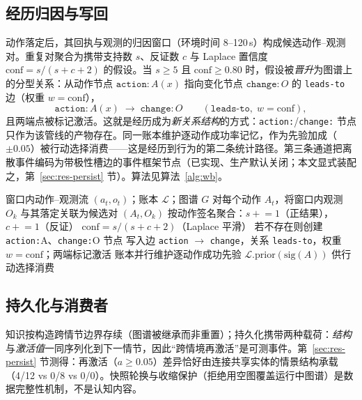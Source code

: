 \documentclass[10pt,a4paper]{ctexart}
\begin{document}
\subsection{经历归因与写回}
\label{sec:arch-wb}
动作落定后，其回执与观测的归因窗口（环境时间 8--120\,s）构成候选动作--观测对。重复对聚合为携带支持数 $s$、反证数 $c$ 与 Laplace 置信度 $\mathrm{conf}=s/(s+c+2)$ 的假设。当 $s\ge 5$ 且 $\mathrm{conf}\ge 0.80$ 时，假设被\emph{晋升}为图谱上的分型关系：从动作节点 $\mathtt{action:}A(x)$ 指向变化节点 $\mathtt{change:}O$ 的 \texttt{leads-to} 边（权重 $w=\mathrm{conf}$），
\begin{equation}
\mathtt{action:}A(x) \;\longrightarrow\; \mathtt{change:}O \qquad (\texttt{leads-to},\; w{=}\mathrm{conf}),
\label{eq:wb}
\end{equation}
且两端点被标记激活。这就是经历成为\emph{新关系结构}的方式：\texttt{action:}/\texttt{change:} 节点只作为该管线的产物存在。同一账本维护逐动作成功率记忆，作为先验加成（$\pm0.05$）被行动选择消费——这是经历到行为的第二条统计路径。第三条通道把离散事件编码为带极性槽边的事件框架节点（已实现、生产默认关闭；本文显式装配之，第~\ref{sec:res-persist} 节）。算法见算法~\ref{alg:wb}。

\begin{algorithm}[t]
\caption{归因--写回：经历到关系知识}\label{alg:wb}
\begin{algorithmic}[1]
\Require 窗口内动作--观测流 $(a_t,o_t)$；账本 $\mathcal{L}$；图谱 $G$
\State 对每个动作 $A_t$，将窗口内观测 $O_k$ 与其落定关联为候选对 $(A_t,O_k)$
\State 按动作签名聚合：$s\mathrel{+}=1$（正结果），$c\mathrel{+}=1$（反证）
\State $\mathrm{conf}=s/(s+c+2)$（Laplace 平滑）
  \State 若不存在则创建 \texttt{action:}A、\texttt{change:}O 节点
  \State 写入边 \texttt{action} $\longrightarrow$ \texttt{change}，关系 \texttt{leads-to}，权重 $w{=}\mathrm{conf}$；两端标记激活
\EndIf
\State 账本并行维护逐动作成功先验 $\mathcal{L}.\mathrm{prior}(\mathrm{sig}(A))$ 供行动选择消费
\end{algorithmic}
\end{algorithm}

\subsection{持久化与消费者}
\label{sec:arch-persist}
知识按构造跨情节边界存续（图谱被继承而非重置）；持久化携带两种载荷：\emph{结构}与\emph{激活值}一同序列化到下一情节，因此“跨情境再激活”是可测事件。第~\ref{sec:res-persist} 节测得：再激活（$a\ge0.05$）差异恰好由连接共享实体的情景结构承载（4/12 vs 0/8 vs 0/0）。快照轮换与收缩保护（拒绝用空图覆盖运行中图谱）是数据完整性机制，不是认知内容。
\end{document}
